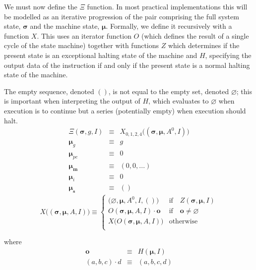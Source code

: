 \documentclass[9pt,oneside]{amsart}
\begin{document}
\begin{multicols}{2}
We must now define the $\Xi$ function. In most practical implementations this will be modelled as an iterative progression of the pair comprising the full system state, $\boldsymbol{\sigma}$ and the machine state, $\boldsymbol{\mu}$. Formally, we define it recursively with a function $X$. This uses an iterator function $O$ (which defines the result of a single cycle of the state machine) together with functions $Z$ which determines if the present state is an exceptional halting state of the machine and $H$, specifying the output data of the instruction if and only if the present state is a normal halting state of the machine.

The empty sequence, denoted $()$, is not equal to the empty set, denoted $\varnothing$; this is important when interpreting the output of $H$, which evaluates to $\varnothing$ when execution is to continue but a series (potentially empty) when execution should halt.
\begin{eqnarray}
\Xi(\boldsymbol{\sigma}, g, I) & \equiv & X_{0,1,2,4}\big((\boldsymbol{\sigma}, \boldsymbol{\mu}, A^0, I)\big) \\
\boldsymbol{\mu}_g & \equiv & g \\
\boldsymbol{\mu}_{pc} & \equiv & 0 \\
\boldsymbol{\mu}_\mathbf{m} & \equiv & (0, 0, ...) \\
\boldsymbol{\mu}_i & \equiv & 0 \\
\boldsymbol{\mu}_\mathbf{s} & \equiv & ()
\end{eqnarray}
\begin{equation}
X\big( (\boldsymbol{\sigma}, \boldsymbol{\mu}, A, I) \big) \equiv \begin{cases}
\big(\varnothing, \boldsymbol{\mu}, A^0, I, ()\big) & \text{if} \quad Z(\boldsymbol{\sigma}, \boldsymbol{\mu}, I)\\
O(\boldsymbol{\sigma}, \boldsymbol{\mu}, A, I) \cdot \mathbf{o} & \text{if} \quad \mathbf{o} \neq \varnothing\\
X\big(O(\boldsymbol{\sigma}, \boldsymbol{\mu}, A, I)\big) & \text{otherwise}\\
\end{cases}
\end{equation}

where
\begin{eqnarray}
\mathbf{o} & \equiv & H(\boldsymbol{\mu}, I) \\
(a, b, c) \cdot d & \equiv & (a, b, c, d)
\end{eqnarray}


\end{multicols}
\end{document}
